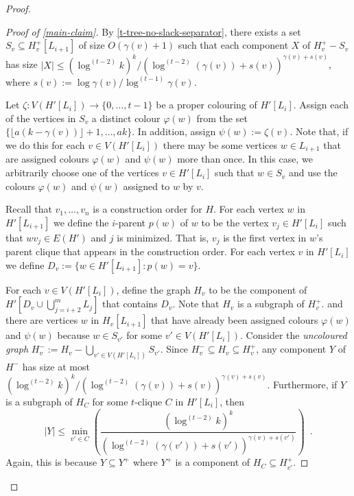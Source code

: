 \documentclass[kpfonts]{patmorin}
\theoremstyle{named}
\begin{document}
\begin{proof}
\begin{proof}[Proof of \cref{main-claim}]

       By \cref{t-tree-no-slack-separator}, there exists a set $S_v\subseteq H^+_v[L_{i+1}]$ of size $O(\gamma(v)+1)$ such that each component $X$ of $H^+_v-S_v$ has size $|X|\le (\log^{(t-2)} k)^k/(\log^{(t-2)} (\gamma(v))+s(v))^{\gamma(v)+s(v)}$, where $s(v):=\log\gamma(v)/\log^{(t-1)}\gamma(v)$.

       Let $\zeta:V(H'[L_i])\to\{0,\ldots,t-1\}$ be a proper colouring of $H'[L_i]$.  Assign each of the vertices in $S_v$ a distinct colour $\varphi(w)$ from the set $\{\lfloor a(k-\gamma(v))\rfloor+1,\ldots,ak\}$.  In addition, assign $\psi(w):=\zeta(v)$.  Note that, if we do this for each $v\in V(H'[L_i])$ there may be some vertices $w\in L_{i+1}$ that are assigned colours $\varphi(w)$ and $\psi(w)$ more than once.  In this case, we arbitrarily choose one of the vertices $v\in H'[L_i]$ such that $w\in S_v$ and use the colours $\varphi(w)$ and $\psi(w)$ assigned to $w$ by $v$.

       Recall that $v_1,\ldots,v_n$ is a construction order for $H$. For each vertex $w$ in $H'[L_{i+1}]$ we define the $i$-parent $p(w)$ of $w$ to be the vertex $v_j\in H'[L_i]$ such that $wv_j\in E(H')$ and $j$ is minimized.  That is, $v_j$ is the first vertex in $w$'s parent clique that appears in the construction order.
       For each vertex $v$ in $H'[L_i]$ we define $D_v:=\{w\in H'[L_{i+1}]: p(w)=v\}$.

       For each $v\in V(H'[L_i])$, define the graph $H_v$ to be the component of $H'[D_v\cup \bigcup_{j=i+2}^m L_j]$ that contains $D_v$.  Note that $H_v$ is a subgraph of $H^+_v$.
       and there are vertices $w$ in $H_v[L_{i+1}]$ that have already been assigned colours $\varphi(w)$ and $\psi(w)$ because $w\in S_{v'}$ for some $v'\in V(H'[L_i])$.  Consider the \emph{uncoloured graph} $H^-_v:=H_v-\bigcup_{v'\in V(H'[L_i])} S_{v'}$.  Since $H^-_v\subseteq H_v\subseteq H^+_v$, any component $Y$ of $H^-$ has size at most $(\log^{(t-2)} k)^k/(\log^{(t-2)} (\gamma(v))+s(v))^{\gamma(v)+s(v)}$.  Furthermore, if $Y$ is a subgraph of $H_C$ for some $t$-clique $C$ in $H'[L_i]$, then
       \[
        |Y| \le \min_{v'\in C}\left(\frac{(\log^{(t-2)}k)^k}{(\log^{(t-2)} (\gamma(v'))+s(v'))^{\gamma(v)+s(v')}} \right) \enspace . \label{min}
       \]
       Again, this is because $Y\subseteq Y^+$ where $Y^+$ is a component of $H_C\subseteq H^+_{v'}$.


\end{proof}
\end{proof}
\end{document}
